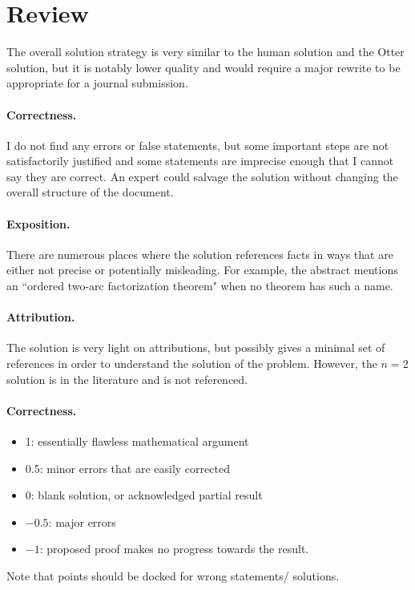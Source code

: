 \documentclass[11pt]{article}
\theoremstyle{remark}
\begin{document}
\maketitle

\section{Review}

The overall solution strategy is very similar to the human solution and the Otter solution, but it is notably lower quality and would require a major rewrite to be appropriate for a journal submission. 

\paragraph{Correctness.} I do not find any errors or false statements, but some important steps are not satisfactorily justified and some statements are imprecise enough that I cannot say they are correct. An expert could salvage the solution without changing the overall structure of the document.

\paragraph{Exposition.} There are numerous places where the solution references facts in ways that are either not precise or potentially misleading. For example, the abstract mentions an ``ordered two-arc factorization theorem" when no theorem has such a name.

\paragraph{Attribution.}
The solution is very light on attributions, but possibly gives a minimal set of references in order to understand the solution of the problem. However, the $n=2$ solution is in the literature and is not referenced.

\paragraph{Correctness.}
\begin{itemize}
	\item  1: essentially flawless mathematical argument
	\item  0.5: minor errors that are easily corrected
	\item  0: blank solution, or acknowledged partial result
	\item  $-0.5$: major errors
	\item  $-1$: proposed proof makes no progress towards the result.
\end{itemize}
Note that points should be docked for wrong statements/ solutions.
\end{document}
